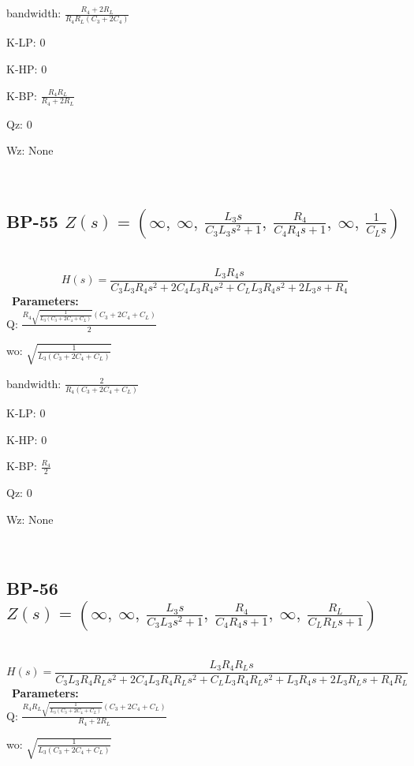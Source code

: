 \documentclass{article}
\begin{document}
bandwidth: $\frac{R_{4} + 2 R_{L}}{R_{4} R_{L} \left(C_{3} + 2 C_{4}\right)}$\ 

K-LP: $0$\ 

K-HP: $0$\ 

K-BP: $\frac{R_{4} R_{L}}{R_{4} + 2 R_{L}}$\ 

Qz: $0$\ 

Wz: $\text{None}$\ 

\ 

\subsection{BP-55 $Z(s) = \left( \infty, \  \infty, \  \frac{L_{3} s}{C_{3} L_{3} s^{2} + 1}, \  \frac{R_{4}}{C_{4} R_{4} s + 1}, \  \infty, \  \frac{1}{C_{L} s}\right)$ } \ 
\textbf{\[H(s) = \frac{L_{3} R_{4} s}{C_{3} L_{3} R_{4} s^{2} + 2 C_{4} L_{3} R_{4} s^{2} + C_{L} L_{3} R_{4} s^{2} + 2 L_{3} s + R_{4}}\] } \ 
\textbf{Parameters:}\\ 

Q: $\frac{R_{4} \sqrt{\frac{1}{L_{3} \left(C_{3} + 2 C_{4} + C_{L}\right)}} \left(C_{3} + 2 C_{4} + C_{L}\right)}{2}$\ 

wo: $\sqrt{\frac{1}{L_{3} \left(C_{3} + 2 C_{4} + C_{L}\right)}}$\ 

bandwidth: $\frac{2}{R_{4} \left(C_{3} + 2 C_{4} + C_{L}\right)}$\ 

K-LP: $0$\ 

K-HP: $0$\ 

K-BP: $\frac{R_{4}}{2}$\ 

Qz: $0$\ 

Wz: $\text{None}$\ 

\ 

\subsection{BP-56 $Z(s) = \left( \infty, \  \infty, \  \frac{L_{3} s}{C_{3} L_{3} s^{2} + 1}, \  \frac{R_{4}}{C_{4} R_{4} s + 1}, \  \infty, \  \frac{R_{L}}{C_{L} R_{L} s + 1}\right)$ } \ 
\textbf{\[H(s) = \frac{L_{3} R_{4} R_{L} s}{C_{3} L_{3} R_{4} R_{L} s^{2} + 2 C_{4} L_{3} R_{4} R_{L} s^{2} + C_{L} L_{3} R_{4} R_{L} s^{2} + L_{3} R_{4} s + 2 L_{3} R_{L} s + R_{4} R_{L}}\] } \ 
\textbf{Parameters:}\\ 

Q: $\frac{R_{4} R_{L} \sqrt{\frac{1}{L_{3} \left(C_{3} + 2 C_{4} + C_{L}\right)}} \left(C_{3} + 2 C_{4} + C_{L}\right)}{R_{4} + 2 R_{L}}$\ 

wo: $\sqrt{\frac{1}{L_{3} \left(C_{3} + 2 C_{4} + C_{L}\right)}}$\ 
\end{document}
